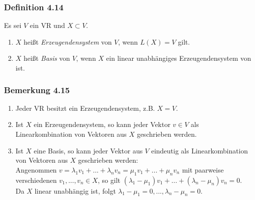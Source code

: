 \documentclass{article}
\begin{document}
\subsubsection*{Definition 4.14}
Es sei $V$ ein VR und $X \subset V$. \\
\begin{enumerate}
    \item $X$ heißt \textit{Erzeugendensystem} von $V$, wenn $L(X) = V$ gilt.
    \item $X$ heißt \textit{Basis} von $V$, wenn $X$ ein linear unabhängiges Erzeugendensystem von ist.
\end{enumerate}

\subsubsection*{Bemerkung 4.15}
\begin{enumerate}
    \item Jeder VR besitzt ein Erzeugendensystem, z.B. $X = V$.
    \item Ist $X$ ein Erzeugendensystem, so kann jeder Vektor $v \in V$ als Linearkombination von Vektoren aus $X$ geschrieben werden. 
    \item Ist $X$ eine Basis, so kann jeder Vektor aus $V$ eindeutig als Linearkombination von Vektoren aus $X$ geschrieben werden: \\
    Angenommen $v = \lambda_1 v_1 + ... + \lambda_n v_n = \mu_1 v_1 + ... + \mu_n v_n$ mit paarweise verschiedenen $v_1,...,v_n \in X$, so gilt $(\lambda_1 - \mu_1) v_1 + ... + (\lambda_n - \mu_n) v_n = 0$. Da $X$ linear unabhängig ist, folgt $\lambda_1 - \mu_1 = 0, ..., \lambda_n - \mu_n = 0$. \\
\end{enumerate}
\end{document}
